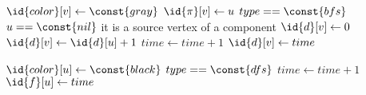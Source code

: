 \begin{codebox}
\li $\id{color}[v] \gets \const{gray}$
\li $\id{\pi}[v] \gets u$
\li \If $type == \const{bfs}$
\li \Then
        \If $u == \const{nil}$ \Comment it is a source vertex of a component
\li     \Then
            $\id{d}[v] \gets 0$
\li     \Else
\li         $\id{d}[v] \gets \id{d}[u] + 1$
        \End
\li \Else
\li     $time \gets time + 1$
\li     $\id{d}[v] \gets time$
    \End
\end{codebox}

\begin{codebox}
\li $\id{color}[u] \gets \const{black}$
\li \If $type == \const{dfs}$
\li \Then
        $time \gets time + 1$
\li     $\id{f}[u] \gets time$
    \End
\end{codebox}